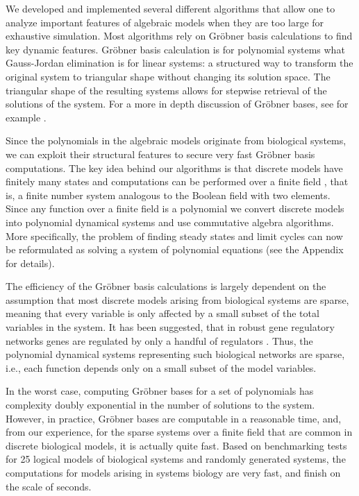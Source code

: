 \documentclass[10pt]{bmc_article}
\begin{document}
We developed and implemented several different algorithms that allow one to analyze
important features of algebraic models when they are too large for exhaustive simulation.
Most algorithms rely on Gr\"obner basis calculations to find key dynamic
features. Gr\"obner basis calculation is for polynomial systems what
Gauss-Jordan elimination is for linear systems: a structured way to transform
the original system to triangular shape without changing its solution space.
The triangular shape of the resulting systems allows for stepwise retrieval of the solutions of the system. For a more in depth discussion of Gr\"obner bases, see for example \cite{IVA}.

%
%
%

Since the polynomials in the algebraic
models originate from biological systems, we can exploit their structural
features to secure very fast Gr\"obner basis computations.
The key idea behind our algorithms is that discrete models have finitely many states and computations
can be performed over a finite field \cite{Alan:Bioinf2010,
Hinkelmann:2010}, that is, a finite number system analogous to the Boolean field with two elements.
Since any function over a finite field is a polynomial
\cite{Lidl:1997} we convert discrete models into polynomial dynamical systems
and use commutative algebra algorithms. More specifically, the problem of finding steady states and limit cycles
can now be reformulated as solving a system of polynomial equations (see the Appendix for details).

The efficiency of the Gr\"obner basis calculations is largely dependent on the
assumption that most discrete models arising from biological systems are
sparse, meaning that every variable is only affected by a small subset of the
total variables in the system. It has been suggested, that in robust gene
regulatory networks genes are regulated by only a handful of regulators
\cite{Leclerc:2008}. Thus, the polynomial dynamical systems representing such biological networks are
sparse, i.e., each function depends only on a small subset of the model variables.

In the worst case, computing Gr\"obner bases for a set of polynomials has
complexity doubly exponential in the number of solutions to the system.
However, in practice, Gr\"{o}bner bases are computable in a reasonable time, and, from our experience,
for the sparse systems over a finite field that are common in discrete
biological models, it is actually quite fast.
Based on benchmarking tests for
25 logical models of biological systems \cite{GINsimRepo}
and randomly generated systems,
the computations for models arising in systems biology are very fast, and finish on the scale of
seconds.
\end{document}
